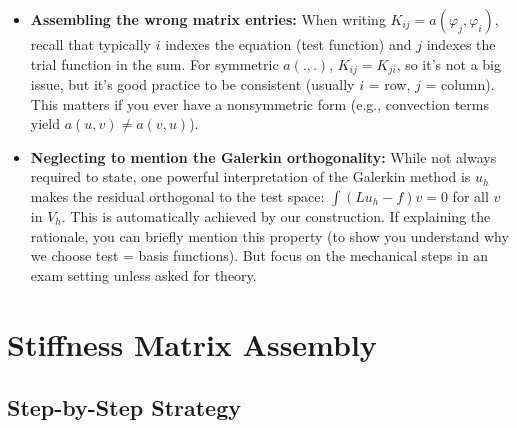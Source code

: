 \documentclass[a4paper,11pt]{article}
\begin{document}
\begin{itemize}
    \item \textbf{Assembling the wrong matrix entries:} When writing $K_{ij} = a(\varphi_j,\varphi_i)$, recall that typically $i$ indexes the equation (test function) and $j$ indexes the trial function in the sum. For symmetric $a(.,.)$, $K_{ij} = K_{ji}$, so it's not a big issue, but it's good practice to be consistent (usually $i$ = row, $j$ = column). This matters if you ever have a nonsymmetric form (e.g., convection terms yield $a(u,v)\neq a(v,u)$).

    \item \textbf{Neglecting to mention the Galerkin orthogonality:} While not always required to state, one powerful interpretation of the Galerkin method is $u_h$ makes the residual orthogonal to the test space: $\int (Lu_h - f)v = 0$ for all $v$ in $V_h$. This is automatically achieved by our construction. If explaining the rationale, you can briefly mention this property (to show you understand why we choose test = basis functions). But focus on the mechanical steps in an exam setting unless asked for theory.
\end{itemize}

\section{Stiffness Matrix Assembly}

\subsection{Step-by-Step Strategy}
\end{document}
